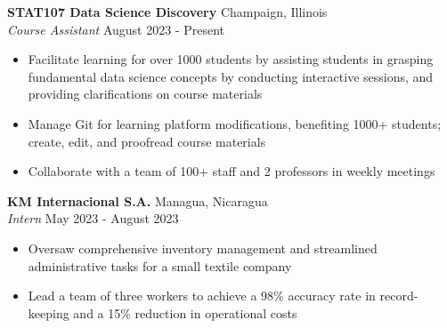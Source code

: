 \documentclass[a4paper]{article}
\begin{document}
\vspace{1mm}


\textbf{STAT107 Data Science Discovery} 
\hfill Champaign, Illinois\\
\textit{Course Assistant} \hfill August 2023 - Present\\
    \begin{itemize}[noitemsep]
    \item Facilitate learning for over 1000 students by assisting 
    students in grasping fundamental
    data science concepts by conducting interactive sessions,
    and providing clarifications on course materials
    \item Manage Git for learning platform modifications, 
    benefiting 1000+ students; create, edit, and proofread course materials
    \item Collaborate with a team of 100+ staff and 2 professors in weekly meetings 
    \end{itemize}

    \vspace{1mm}

\textbf{KM Internacional S.A.} \hfill Managua, Nicaragua\\
\textit{Intern} \hfill May 2023 - August 2023\\
    \begin{itemize}[noitemsep]
	\item  Oversaw comprehensive inventory management and streamlined
     administrative tasks for a small textile company
    \item Lead a team of three workers to achieve a 98\% 
    accuracy rate in record-keeping 
    and a 15\% reduction in operational costs
\end{itemize}
\end{document}
